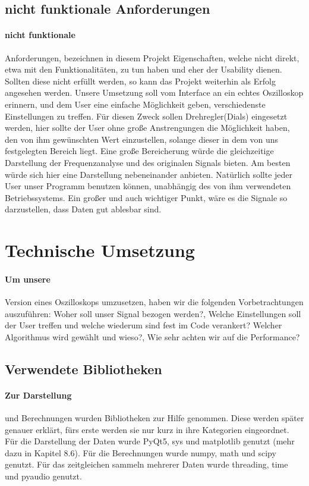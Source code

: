 \documentclass{article}
\begin{document}
\subsection{nicht funktionale Anforderungen}
\paragraph{nicht funktionale}
Anforderungen, bezeichnen in diesem Projekt Eigenschaften, welche nicht direkt, etwa mit den Funktionalitäten, zu tun haben und eher der Usability dienen. Sollten diese nicht erfüllt werden, so kann das Projekt weiterhin als Erfolg angesehen werden.
Unsere Umsetzung soll vom Interface an ein echtes Oszilloskop erinnern, und dem User eine einfache Möglichkeit geben, verschiedenste Einstellungen zu treffen. Für diesen Zweck sollen Drehregler(Dials) eingesetzt werden, hier sollte der User ohne große Anstrengungen die Möglichkeit haben, den von ihm gewünschten Wert einzustellen, solange dieser in dem von uns festgelegten Bereich liegt. Eine große Bereicherung würde die gleichzeitige Darstellung der Frequenzanalyse und des originalen Signals bieten. Am besten würde sich hier eine Darstellung nebeneinander anbieten. Natürlich sollte jeder User unser Programm benutzen können, unabhängig des von ihm verwendeten Betriebssystems. Ein großer und auch wichtiger Punkt, wäre es die Signale so darzustellen, dass Daten gut ablesbar sind.

\section{Technische Umsetzung}

\paragraph{Um unsere}
Version eines Oszilloskops umzusetzen, haben wir die folgenden Vorbetrachtungen auszuführen: Woher soll unser Signal bezogen werden?, Welche Einstellungen soll der User treffen und welche wiederum sind fest im Code verankert? Welcher Algorithmus wird gewählt und wieso?, Wie sehr achten wir auf die Performance?


\subsection{Verwendete Bibliotheken}
\paragraph{Zur Darstellung}
und Berechnungen wurden Bibliotheken zur Hilfe genommen. Diese werden später genauer erklärt, fürs erste werden sie nur kurz in ihre Kategorien eingeordnet. Für die Darstellung der Daten wurde PyQt5, sys und matplotlib genutzt (mehr dazu in Kapitel 8.6). Für die Berechnungen wurde numpy, math und scipy genutzt. Für das zeitgleichen sammeln mehrerer Daten wurde threading, time und pyaudio genutzt.
\end{document}

